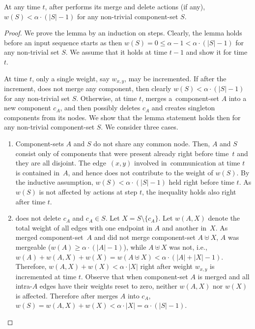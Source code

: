\begin{lemma}
\label{lem:wS_bound}
At any time $t$, after \CREP performs its merge and delete actions (if any),
$w(S) < \alpha \cdot (|S|-1)$ for any non-trivial component-set $S$.
\end{lemma}

\begin{proof}
We prove the lemma by an induction on steps. Clearly, the lemma holds before an
input sequence starts as then $w(S) = 0 \leq \alpha - 1 < \alpha \cdot
(|S|-1)$ for any non-trivial set $S$. We assume that it holds at time $t-1$
and show it for time $t$.

At time $t$, only a single weight, say $w_{x,y}$, may be incremented. If after
the increment, \CREP does not merge any component, then clearly $w(S) < \alpha
\cdot (|S|-1)$ for any non-trivial set $S$. Otherwise, at time $t$, \CREP
merges a~component-set $A$ into a new component $c_A$, and then possibly
deletes $c_A$ and creates singleton components from its nodes. We show that
the lemma statement holds then for any non-trivial component-set $S$. We
consider three cases.

\begin{enumerate}

\item Component-sets $A$ and $S$ do not share any common node. Then, $A$ and
$S$ consist only of components that were present already right before time~$t$
and they are all disjoint. The edge~$(x,y)$ involved in~communication at time
$t$ is contained in~$A$, and hence does not contribute to the weight of
$w(S)$. By the inductive assumption, $w(S) < \alpha \cdot (|S|-1)$ held right
before time $t$. As $w(S)$ is not affected by \CREP actions at step $t$, the
inequality holds also right after time $t$.

\item \CREP does not delete $c_A$ and $c_A \in S$. Let $X = S \setminus
\{c_A\}$. Let $w(A,X)$ denote the total weight of all edges with one endpoint
in $A$ and another in~$X$. As \CREP merged component-set~$A$ and did not merge
component-set $A \uplus X$, $A$ was mergeable ($w(A) \geq \alpha \cdot
(|A|-1)$), while $A \uplus X$ was not, i.e., $w(A) + w(A,X) + w(X) = w(A
\uplus X) < \alpha \cdot (|A|+|X|-1)$. Therefore, $w(A,X) + w(X) < \alpha
\cdot |X|$ right after weight $w_{x,y}$ is incremented at time $t$. Observe
that when component-set $A$ is merged and all intra-$A$ edges have their weights 
reset to zero, neither $w(A,X)$ nor $w(X)$ is affected.
Therefore after \CREP merges $A$ into $c_A$, $w(S) =
w(A,X) + w(X) < \alpha \cdot |X| = \alpha \cdot (|S| - 1)$.


\end{enumerate}
\end{proof}

